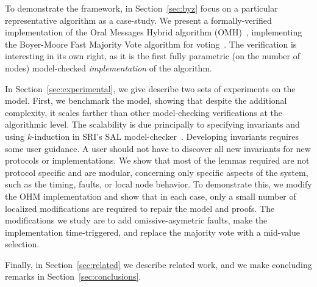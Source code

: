 \documentclass{llncs/llncs}
\newcommand{\OMH}{\ensuremath{\mathrm{OMH}}}
\begin{document}
To demonstrate the framework, in Section~\ref{sec:byz} focus on a particular representative algorithm as a case-study. We present a formally-verified implementation of the Oral Messages Hybrid algorithm (\OMH)~\cite{Lincoln-Rushby}, implementing the Boyer-Moore Fast Majority Vote algorithm for voting~\cite{Boyer-Moore:91}. The verification is interesting in its own right, as it is the first fully parametric (on the number of nodes) model-checked \emph{implementation} of the algorithm.

In Section~\ref{sec:experimental}, we give describe two sets of experiments on the model. First, we benchmark the model, showing that despite the additional complexity, it scales farther than other model-checking verifications at the algorithmic level. The scalability is due principally to specifying invariants and using $k$-induction in SRI's SAL model-checker~\cite{sal}. Developing invariants requires some user guidance. A user should not have to discover all new invariants for new protocols or implementations. We show that most of the lemmas required are not protocol specific and are modular, concerning only specific aspects of the system, such as the timing, faults, or local node behavior. To demonstrate this, we modify the OHM implementation and show that in each case, only a small number of localized modifications are required to repair the model and proofs. The modifications we study are to add omissive-asymetric faults, make the implementation time-triggered, and replace the majority vote with a mid-value selection.

Finally, in Section~\ref{sec:related} we describe related work, and we make concluding remarks in Section~\ref{sec:conclusions}.




\end{document}
